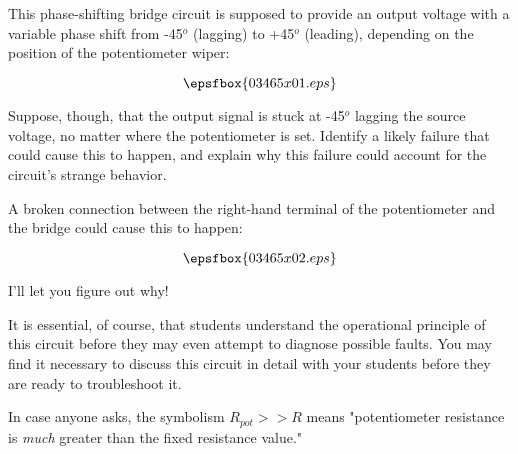 

This phase-shifting bridge circuit is supposed to provide an output voltage with a variable phase shift from -45$^{o}$ (lagging) to +45$^{o}$ (leading), depending on the position of the potentiometer wiper:

$$\epsfbox{03465x01.eps}$$

Suppose, though, that the output signal is stuck at -45$^{o}$ lagging the source voltage, no matter where the potentiometer is set.  Identify a likely failure that could cause this to happen, and explain why this failure could account for the circuit's strange behavior.







A broken connection between the right-hand terminal of the potentiometer and the bridge could cause this to happen:

$$\epsfbox{03465x02.eps}$$

I'll let you figure out why!







It is essential, of course, that students understand the operational principle of this circuit before they may even attempt to diagnose possible faults.  You may find it necessary to discuss this circuit in detail with your students before they are ready to troubleshoot it.

In case anyone asks, the symbolism $R_{pot} >> R$ means "potentiometer resistance is {\it much} greater than the fixed resistance value."




